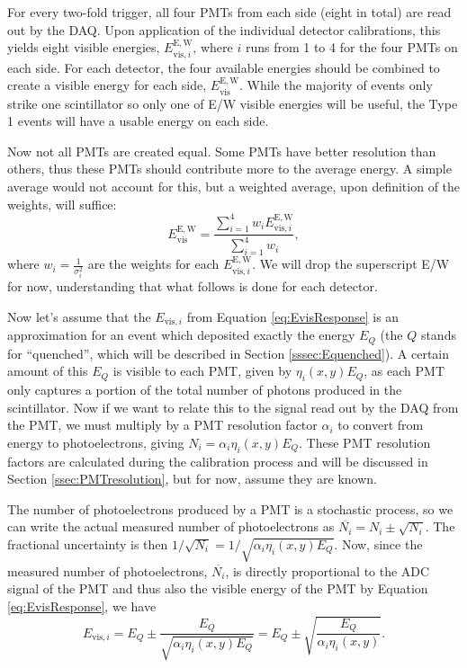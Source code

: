 For every two-fold trigger, all four PMTs from each side (eight in total) are read out by the
DAQ. Upon application of the individual detector calibrations, this yields
eight visible energies, $E_{\mathrm{vis},i}^\mathrm{E,W}$, where $i$ runs from 1 to 4 for the
four PMTs on each side. For each detector, the four available energies should
be combined to create a visible energy for each side, $E_{\mathrm{vis}}^\mathrm{E,W}$. While the
majority of events only strike one scintillator so only one of E/W visible energies will
be useful, the Type 1 events will have a usable energy on each side.

Now not all PMTs are created equal. Some PMTs have better resolution than others, thus these PMTs
should contribute more to the average energy. A simple average would not account for this, but
a weighted average, upon definition of the weights, will suffice:
%
\begin{equation}
  E_{\mathrm{vis}}^\mathrm{E,W} = \frac{\sum_{i=1}^{4} w_i E_{\mathrm{vis},i}^{\mathrm{E,W}}}{\sum_{i=1}^{4} w_i},
\end{equation}
%
where $w_i=\frac{1}{\sigma_i^2}$ are the weights for each $E_{\mathrm{vis},i}^{\mathrm{E,W}}$. We will drop the superscript
E/W for now, understanding that what follows is done for each detector.

Now let's assume that the $E_{\mathrm{vis},i}$ from Equation \ref{eq:EvisResponse} is an approximation
for an event which deposited exactly the energy $E_Q$ (the $Q$ stands for ``quenched'', which will
be described in Section \ref{sssec:Equenched}). A certain amount of this $E_Q$ is visible to each
PMT, given by $\eta_i(x,y)E_Q$, as each PMT only captures a portion of the total number of photons produced
in the scintillator.
Now if we want to relate this to the signal read out by the DAQ
from the PMT, we must multiply by a PMT resolution factor $\alpha_i$ to convert from energy
to photoelectrons, giving $N_i = \alpha_i \eta_i(x,y) E_Q$.
These PMT resolution factors are calculated during the calibration process
and will be discussed in Section \ref{ssec:PMTresolution}, but for now, assume they are known.

The number of photoelectrons produced by a PMT is a stochastic process, so we can write the actual
measured number of photoelectrons as $\overline{N_i} = N_i \pm \sqrt{N_i}$. The fractional uncertainty
is then $1/\sqrt{N_i} = 1/\sqrt{\alpha_i \eta_i(x,y) E_Q}$. Now, since the measured number of photoelectrons,
$\overline{N_i}$, is directly proportional to the ADC signal of the PMT and thus also the visible energy
of the PMT by Equation \ref{eq:EvisResponse}, we have
%
\begin{equation}
  E_{\mathrm{vis},i} = E_Q \pm \frac{E_Q}{\sqrt{\alpha_i \eta_i(x,y) E_Q}} =  E_Q \pm \sqrt{\frac{E_Q}{\alpha_i \eta_i(x,y)}}.
\end{equation}
%

